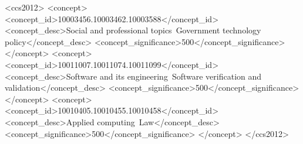 \documentclass[sigconf]{acmart}
\begin{document}
\begin{CCSXML}
<ccs2012>
   <concept>
       <concept_id>10003456.10003462.10003588</concept_id>
       <concept_desc>Social and professional topics~Government technology policy</concept_desc>
       <concept_significance>500</concept_significance>
       </concept>
   <concept>
       <concept_id>10011007.10011074.10011099</concept_id>
       <concept_desc>Software and its engineering~Software verification and validation</concept_desc>
       <concept_significance>500</concept_significance>
       </concept>
   <concept>
       <concept_id>10010405.10010455.10010458</concept_id>
       <concept_desc>Applied computing~Law</concept_desc>
       <concept_significance>500</concept_significance>
       </concept>
 </ccs2012>
\end{CCSXML}





\maketitle








\end{document}
